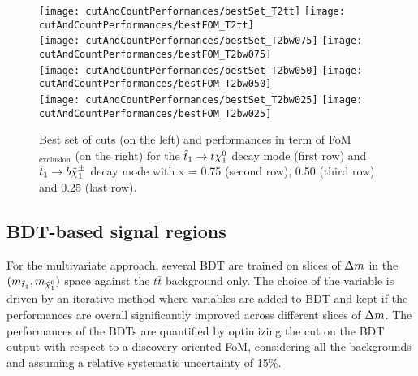             \begin{figure}[h!]
                \centering
                \texttt{[image: cutAndCountPerformances/bestSet\_T2tt]}
                \texttt{[image: cutAndCountPerformances/bestFOM\_T2tt]}\\
                \texttt{[image: cutAndCountPerformances/bestSet\_T2bw075]}
                \texttt{[image: cutAndCountPerformances/bestFOM\_T2bw075]}\\
                \texttt{[image: cutAndCountPerformances/bestSet\_T2bw050]}
                \texttt{[image: cutAndCountPerformances/bestFOM\_T2bw050]}\\
                \texttt{[image: cutAndCountPerformances/bestSet\_T2bw025]}
                \texttt{[image: cutAndCountPerformances/bestFOM\_T2bw025]}
                \caption{Best set of cuts (on the left) and performances in term of
                FoM$_\text{exclusion}$ (on the right) for the $\tilde{t}_1 \rightarrow t
                \tilde{\chi}_1^0$ decay mode (first row) and $\tilde{t}_1 \rightarrow b \tilde{\chi}_1^\pm$
                decay mode with x = 0.75 (second row), 0.50 (third row) and 0.25 (last row).
                }
                \label{fig:cutAndCountPerformances}
            \end{figure}

        \subsection{BDT-based signal regions}

        For the multivariate approach, several BDT are trained on slices of $\Delta m$ in the $(m_{\tilde{t}_1},m_{\tilde{\chi}_1^0})$
        space against the $t\bar{t}$ background only. The choice of the variable is driven by an iterative method where variables
        are added to BDT and kept if the performances are overall significantly improved across different slices of $\Delta m$. The
        performances of the BDTs are quantified by optimizing the cut on the BDT output with respect to a discovery-oriented
        FoM, considering all the backgrounds and assuming a relative systematic uncertainty of 15\%.

